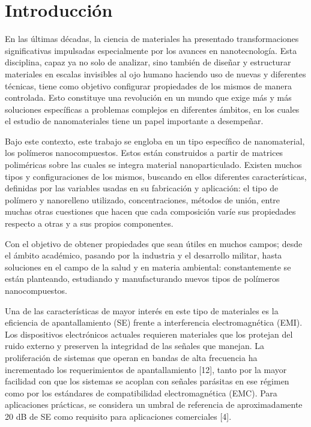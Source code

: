 \chapter{Introducción}
En las últimas décadas, la ciencia de materiales ha presentado transformaciones significativas impulsadas especialmente por los avances en nanotecnología. Esta disciplina, capaz ya no solo de analizar, sino también de diseñar y estructurar materiales en escalas invisibles al ojo humano haciendo uso de nuevas y diferentes técnicas, tiene como objetivo configurar propiedades de los mismos de manera controlada. Esto constituye una revolución en un mundo que exige más y más soluciones específicas a problemas complejos en diferentes ámbitos, en los cuales el estudio de nanomateriales tiene un papel importante a desempeñar.

Bajo este contexto, este trabajo se engloba en un tipo específico de nanomaterial, los polímeros nanocompuestos. Estos están construidos a partir de matrices poliméricas sobre las cuales se integra material nanoparticulado. Existen muchos tipos y configuraciones de los mismos, buscando en ellos diferentes características, definidas por las variables usadas en su fabricación y aplicación: el tipo de polímero y nanorelleno utilizado, concentraciones, métodos de unión, entre muchas otras cuestiones que hacen que cada composición varíe sus propiedades respecto a otras y a sus propios componentes.

Con el objetivo de obtener propiedades que sean útiles en muchos campos; desde el ámbito académico, pasando por la industria y el desarrollo militar, hasta soluciones en el campo de la salud y en materia ambiental: constantemente se están planteando, estudiando y manufacturando nuevos tipos de polímeros nanocompuestos.  

Una de las características de mayor interés en este tipo de materiales es la eficiencia de apantallamiento (SE) frente a interferencia electromagnética (EMI). Los dispositivos electrónicos actuales requieren materiales que los protejan del ruido externo y preserven la integridad de las señales que manejan. La proliferación de sistemas que operan en bandas de alta frecuencia ha incrementado los requerimientos de apantallamiento [12], tanto por la mayor facilidad con que los sistemas se acoplan con señales parásitas en ese régimen como por los estándares de compatibilidad electromagnética (EMC). Para aplicaciones prácticas, se considera un umbral de referencia de aproximadamente 20 dB de SE como requisito para aplicaciones comerciales [4]. 

